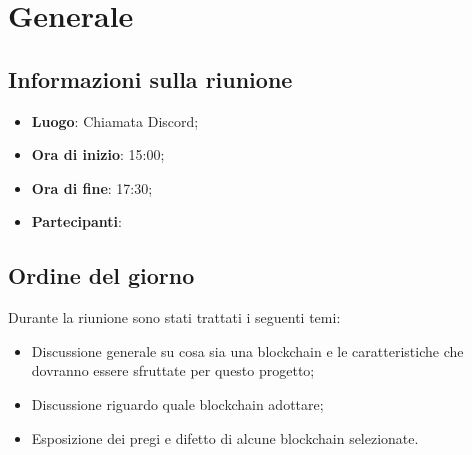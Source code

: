 \section{Generale}

\vspace{10pt}


\subsection{Informazioni sulla riunione}
\begin{itemize}
	\item \textbf{Luogo}: Chiamata Discord;
	\item \textbf{Ora di inizio}: 15:00;
	\item \textbf{Ora di fine}: 17:30;
	\item \textbf{Partecipanti}: \team
\end{itemize}

\vspace{5pt}

\subsection{Ordine del giorno}
Durante la riunione sono stati trattati i seguenti temi:
\begin{itemize}
	\item Discussione generale su cosa sia una blockchain e le caratteristiche che dovranno essere sfruttate per questo progetto;
	\item Discussione riguardo quale blockchain adottare;
	\item Esposizione dei pregi e difetto di alcune blockchain selezionate.
\end{itemize}
